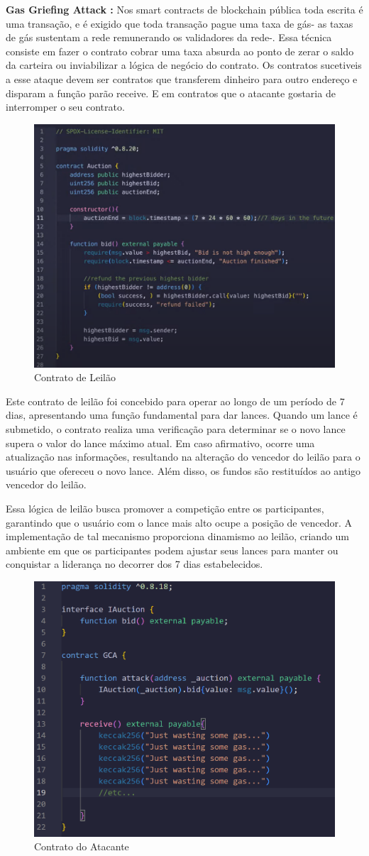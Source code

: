 \textbf{Gas Griefing Attack \cite{GGA}:} Nos smart contracts de blockchain pública toda escrita é uma transação, e é exigido que toda transação pague uma taxa de gás- as taxas de gás sustentam a rede remunerando os validadores da rede-. 
Essa técnica consiste em fazer o contrato cobrar uma  taxa absurda ao ponto de zerar o saldo da carteira ou inviabilizar a lógica de negócio do contrato. 
Os contratos sucetiveis a esse ataque devem ser contratos que transferem dinheiro para outro endereço e disparam a função parão receive. E em contratos que o atacante gostaria de interromper o seu contrato.
\begin{figure}
    \centering
    \includegraphics[width=0.5\linewidth]{figuras/Auction.png}
    \caption{Contrato de Leilão}
    \label{fig:enter-label}
\end{figure}

Este contrato de leilão foi concebido para operar ao longo de um período de 7 dias, apresentando uma função fundamental para dar lances. Quando um lance é submetido, o contrato realiza uma verificação para determinar se o novo lance supera o valor do lance máximo atual. Em caso afirmativo, ocorre uma atualização nas informações, resultando na alteração do vencedor do leilão para o usuário que ofereceu o novo lance. Além disso, os fundos são restituídos ao antigo vencedor do leilão.

Essa lógica de leilão busca promover a competição entre os participantes, garantindo que o usuário com o lance mais alto ocupe a posição de vencedor. A implementação de tal mecanismo proporciona dinamismo ao leilão, criando um ambiente em que os participantes podem ajustar seus lances para manter ou conquistar a liderança no decorrer dos 7 dias estabelecidos.

 \begin{figure}
    \centering
    \includegraphics[width=0.5\linewidth]{figuras/GGA.png}
    \caption{Contrato do Atacante}
    \label{fig:enter-label}
\end{figure}


